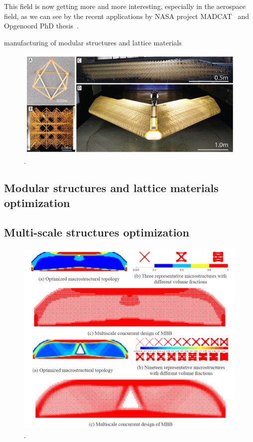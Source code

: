 This field is now getting more and more interesting, especially in the aerospace field, as we can see by the recent applications by NASA project MADCAT~ and Opgenoord PhD thesis~.

manufacturing of modular structures and lattice materials

\begin{figure}
    \centering
    \includegraphics[width=\linewidth]{figures/02_literature/nasa-madcat-morphing-wing-breakdown-1000-x-600(1).jpg}
    \caption{\cite{cramer_elastic_2019}.}
    \label{fig:02_}
\end{figure}

\subsection{Modular structures and lattice materials optimization}

\subsection{Multi-scale structures optimization}
\begin{figure}
    \centering
    \includegraphics[width=0.7\linewidth]{figures/02_literature/top_multiscale.png}
    \caption{\cite{}.}
    \label{fig:02_}
\end{figure}

